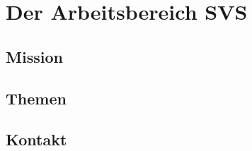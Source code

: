 
%
%
%
%
%

%
%









\section{Der Arbeitsbereich SVS} %
\subsection{Mission} %
\subsection{Themen} %
\subsection{Kontakt} %

